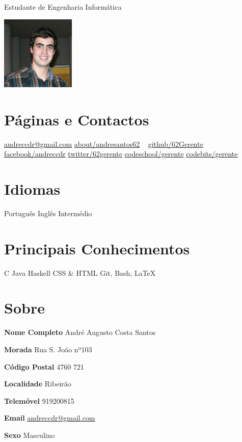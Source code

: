 \documentclass[]{friggeri-cv}
\begin{document}
       {Estudante de Engenharia Informática}


\begin{aside}
  \includegraphics[height=100pt]{foto}
  \section{Páginas e Contactos}
    \href{mailito:andreccdr@gmail.com}{andreccdr@gmail.com}
    \href{http://about.me/andresantos62}{about/andresantos62}
    ~
    \href{https://github.com/62Gerente}{github/62Gerente}
    \href{https://www.facebook.com/andreccdr}{facebook/andreccdr}
    \href{https://twitter.com/62gerente}{twitter/62gerente}
    \href{http://www.codeschool.com/users/gerente}{codeschool/gerente}
    \href{https://codebits.eu/gerente}{codebits/gerente}
   \section{Idiomas}
    Português
    Inglês Intermédio
  \section{Principais Conhecimentos}
    C
    Java
    Haskell
    CSS \& HTML
    Git, Bash, \LaTeX
\end{aside}

\section{Sobre}

\textbf{Nome Completo} André Augusto Costa Santos

\begin{multicols}{3}
\textbf{Morada} Rua S. João nº103  

\textbf{Código Postal} 4760 721 

\textbf{Localidade} Ribeirão
\end{multicols}

\begin{multicols}{3}
\textbf{Telemóvel} 919200815  

\textbf{Email} \href{mailito:andreccdr@gmail.com}{andreccdr@gmail.com}

\textbf{Sexo} Masculino
\end{multicols}
\end{document}
